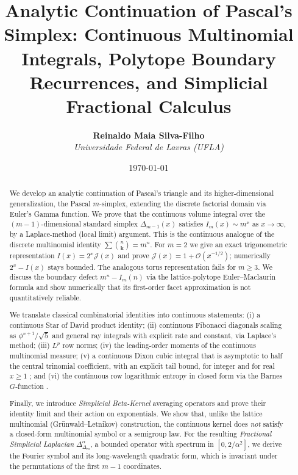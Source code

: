 \documentclass[11pt,a4paper]{article}
\title{\textbf{Analytic Continuation of Pascal's Simplex: Continuous Multinomial Integrals, Polytope Boundary Recurrences, and Simplicial Fractional Calculus}}
\author{\textbf{Reinaldo Maia Silva-Filho} \\ \textit{Universidade Federal de Lavras (UFLA)}}
\date{\today}
\theoremstyle{plain}
\theoremstyle{definition}
\theoremstyle{remark}
\numberwithin{equation}{section}
\begin{document}
\maketitle

\begin{abstract}
We develop an analytic continuation of Pascal's triangle and its higher-dimensional generalization, the Pascal $m$-simplex, extending the discrete factorial domain via Euler's Gamma function. We prove that the continuous volume integral over the $(m-1)$-dimensional standard simplex $\Delta_{m-1}(x)$ satisfies $I_m(x) \sim m^x$ as $x \to \infty$, by a Laplace-method (local limit) argument. This is the continuous analogue of the discrete multinomial identity $\sum \binom{n}{\mathbf{k}} = m^n$. For $m = 2$ we give an exact trigonometric representation $I(x) = 2^x\mathcal{J}(x)$ and prove $\mathcal{J}(x) = 1 + \mathcal{O}(x^{-1/2})$; numerically $2^x - I(x)$ stays bounded. The analogous torus representation fails for $m \ge 3$. We discuss the boundary defect $m^n - I_m(n)$ via the lattice-polytope Euler--Maclaurin formula \cite{berline2007} and show numerically that its first-order facet approximation is not quantitatively reliable.

We translate classical combinatorial identities into continuous statements: (i) a continuous Star of David product identity; (ii) continuous Fibonacci diagonals scaling as $\phi^{x+1}/\sqrt{5}$ and general ray integrals with explicit rate and constant, via Laplace's method; (iii) $L^p$ row norms; (iv) the leading-order moments of the continuous multinomial measure; (v) a continuous Dixon cubic integral that is asymptotic to half the central trinomial coefficient, with an explicit tail bound, for integer and for real $x\ge1$ \cite{dixon1891,cohlvolkmer2025}; and (vi) the continuous row logarithmic entropy in closed form via the Barnes $G$-function \cite{barnes1900}.

Finally, we introduce \emph{Simplicial Beta-Kernel} averaging operators and prove their identity limit and their action on exponentials. We show that, unlike the lattice multinomial (Gr\"unwald--Letnikov) construction, the continuous kernel does \emph{not} satisfy a closed-form multinomial symbol or a semigroup law. For the resulting \emph{Fractional Simplicial Laplacian} $\Delta_{\Delta_m}^\alpha$, a bounded operator with spectrum in $[0, 2/\alpha^2]$, we derive the Fourier symbol and its long-wavelength quadratic form, which is invariant under the permutations of the first $m-1$ coordinates.
\end{abstract}
\end{document}
